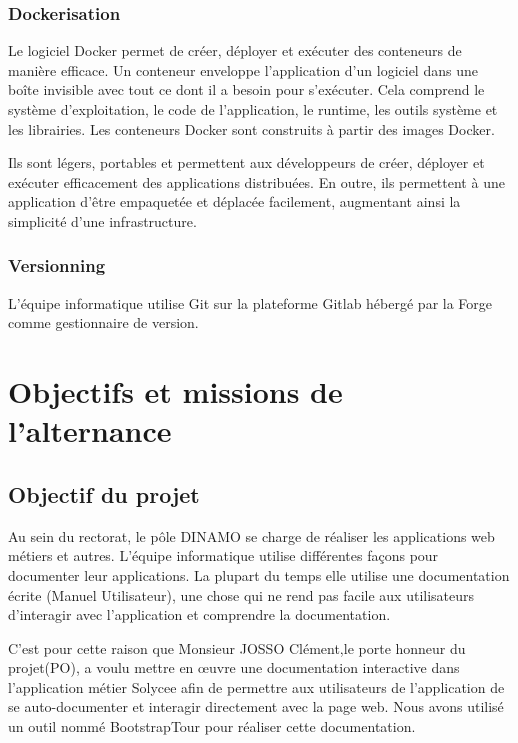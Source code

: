 \documentclass[a4paper]{article}
\begin{document}
\subsubsection{Dockerisation}

Le logiciel Docker permet de créer, déployer et exécuter des conteneurs de manière efficace. Un conteneur enveloppe l’application d’un logiciel dans une boîte invisible avec tout ce dont il a besoin pour s’exécuter. Cela comprend le
système d’exploitation, le code de l’application, le runtime, les outils système et les librairies. Les conteneurs Docker sont construits à partir des images Docker.

Ils sont légers, portables et permettent aux développeurs de créer, déployer et exécuter efficacement des applications distribuées. En outre, ils permettent à une application d’être empaquetée et déplacée facilement, augmentant ainsi la simplicité d’une infrastructure.

\subsubsection{Versionning}

L'équipe informatique utilise Git sur la plateforme Gitlab hébergé par la Forge comme gestionnaire de version. 


\section{Objectifs et missions de l'alternance}

\subsection{Objectif du projet}

Au sein du rectorat, le pôle DINAMO se charge de réaliser les applications web métiers et autres. L'équipe informatique utilise différentes façons pour documenter leur applications. La plupart du temps elle utilise une documentation écrite (Manuel Utilisateur), une chose qui ne rend pas facile aux utilisateurs d’interagir avec l'application et comprendre la documentation. 


C'est pour cette raison que Monsieur JOSSO Clément,le porte honneur du projet(PO), a voulu mettre en œuvre une documentation interactive dans l'application métier Solycee afin de permettre aux utilisateurs de l'application de se auto-documenter et interagir directement avec la page web. Nous avons utilisé un outil nommé BootstrapTour pour réaliser cette documentation. 
\end{document}
